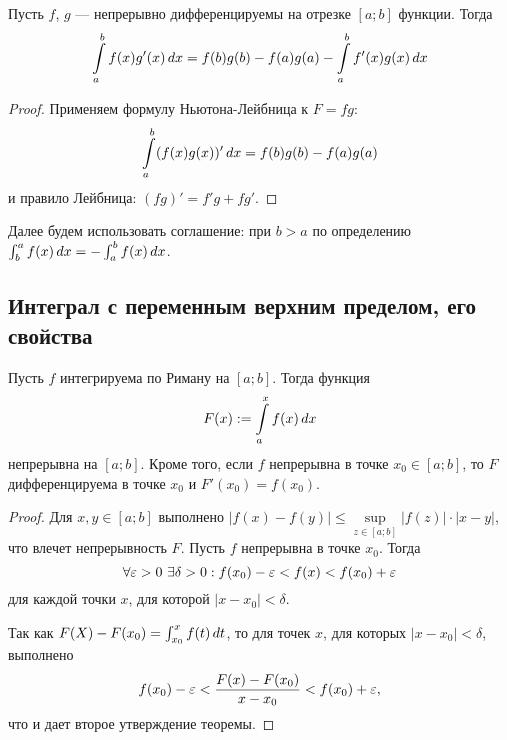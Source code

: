 \documentclass[a4paper]{article}
\theoremstyle{named}
\renewcommand{\int}{\intop}
\begin{document}
        \begin{consequence*}
            Пусть $f$, $g$ --- непрерывно дифференцируемы на отрезке $[a; b]$ функции. Тогда
            \begin{equation*}
                \int_a^b f(x) g'(x) \dd x = f(b) g(b) - f(a) g(a) - \int_a^b f'(x) g(x) \dd x
            \end{equation*}
        \end{consequence*}

        \begin{proof}
            Применяем формулу Ньютона-Лейбница к $F = fg$:
            \begin{equation*}
                \int_a^b (f(x)g(x))' \dd x = f(b)g(b) - f(a)g(a)
            \end{equation*}
            и правило Лейбница: $(fg)' = f'g + fg'$.
        \end{proof}

        Далее будем использовать соглашение: при $b > a$ по определению $\int_b^a f(x) \dd x = - \int_a^b f(x) \dd x$.

        \subsection{Интеграл с переменным верхним пределом, его свойства}

        \begin{theorem*}
            Пусть $f$ интегрируема по Риману на $[a; b]$. Тогда функция
            \begin{equation*}
                F(x) := \int_a^x f(x) \dd x
            \end{equation*}
            непрерывна на $[a; b]$. Кроме того, если $f$ непрерывна в точке $x_0 \in [a; b]$, то $F$ дифференцируема в точке $x_0$ и $F'(x_0) = f(x_0)$.
        \end{theorem*}

        \begin{proof}
            Для $x, y \in [a; b]$ выполнено $|f(x) - f(y)| \leq \sup\limits_{z \in [a; b]} |f(z)| \cdot |x - y|$, что влечет непрерывность $F$. Пусть $f$ непрерывна в точке $x_0$. Тогда
            \begin{equation*}
                \forall \varepsilon > 0 \ \exists \delta > 0: f(x_0) - \varepsilon < f(x) < f(x_0) + \varepsilon
            \end{equation*}
            для каждой точки $x$, для которой $|x - x_0| < \delta$.

            Так как $F(X) - F(x_0) = \int_{x_0}^x f(t) \dd t$, то для точек $x$, для которых $|x - x_0| < \delta$, выполнено
            \begin{equation*}
                f(x_0) - \varepsilon < \dfrac{F(x) - F(x_0)}{x - x_0} < f(x_0) + \varepsilon,
            \end{equation*}
            что и дает второе утверждение теоремы.
        \end{proof}
\end{document}
